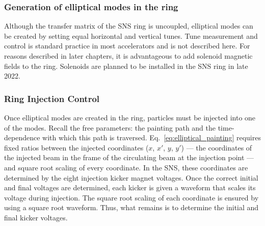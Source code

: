 \subsubsection{Generation of elliptical modes in the ring}

Although the transfer matrix of the SNS ring is uncoupled, elliptical modes can be created by setting equal horizontal and vertical tunes. Tune measurement and control is standard practice in most accelerators \cite{book:Minty2003} and is not described here. For reasons described in later chapters, it is advantageous to add solenoid magnetic fields to the ring. Solenoids are planned to be installed in the SNS ring in late 2022.


\subsubsection{Ring Injection Control}

Once elliptical modes are created in the ring, particles must be injected into one of the modes. Recall the free parameters: the painting path and the time-dependence with which this path is traversed. Eq.~\ref{eq:elliptical_painting} requires fixed ratios between the injected coordinates ($x$, $x'$, $y$, $y'$) — the coordinates of the injected beam in the frame of the circulating beam at the injection point — and square root scaling of every coordinate. In the SNS, these coordinates are determined by the eight injection kicker magnet voltages. Once the correct initial and final voltages are determined, each kicker is given a waveform that scales its voltage during injection. The square root scaling of each coordinate is ensured by using a square root waveform. Thus, what remains is to determine the initial and final kicker voltages. 

